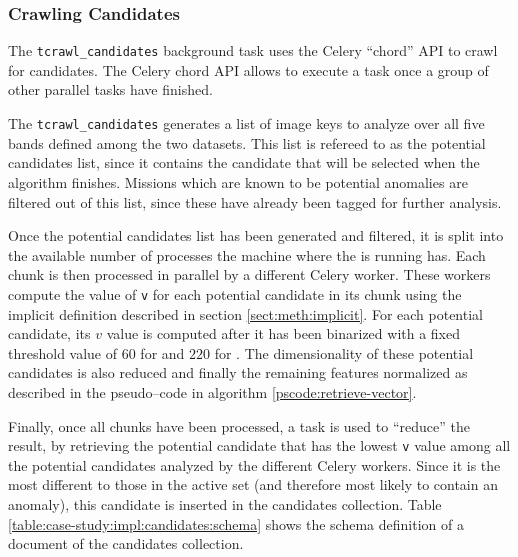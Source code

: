 \subsubsection{Crawling Candidates} \label{subsubsect:case-study:impl:crawling-candidates}

The \texttt{tcrawl\_candidates} background task uses the Celery ``chord'' API to crawl for candidates. The Celery chord API allows to execute a task once a group of other parallel tasks have finished. \newline

The \texttt{tcrawl\_candidates} generates a list of image keys to analyze over all five bands defined among the two datasets. This list is refereed to as the potential candidates list, since it contains the candidate that will be selected when the algorithm finishes. Missions which are known to be potential anomalies are filtered out of this list, since these have already been tagged for further analysis. \newline

Once the potential candidates list has been generated and filtered, it is split into the available number of processes the machine where the \mlblinkapi is running has. Each chunk is then processed in parallel by a different Celery worker. These workers compute the value of \texttt{v} for each potential candidate in its chunk using the implicit definition described in section \ref{sect:meth:implicit}. For each potential candidate, its $v$ value is computed after it has been binarized with a fixed threshold value of $60$ for \usno and $220$ for \panstarrs. The dimensionality of these potential candidates is also reduced and finally the remaining features normalized as described in the pseudo--code in  algorithm \ref{pscode:retrieve-vector}. \newline

Finally, once all chunks have been processed, a task is used to ``reduce'' the result, by retrieving the potential candidate that has the lowest \texttt{v} value among all the potential candidates analyzed by the different Celery workers. Since it is the most different to those in the active set (and therefore most likely to contain an anomaly), this candidate is inserted in the candidates collection. Table \ref{table:case-study:impl:candidates:schema} shows the schema definition of a document of the candidates collection.

